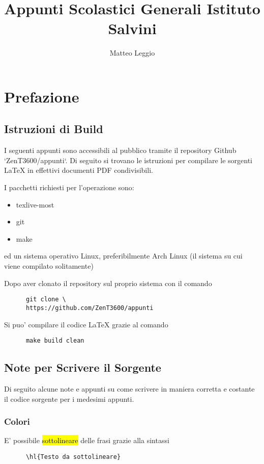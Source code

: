 \documentclass{article}
\begin{document}
  \title{\Huge Appunti Scolastici  Generali Istituto Salvini}
  \author{\Large Matteo Leggio}
  \date{}
  \maketitle

  \section{Prefazione}
  {
    \subsection{Istruzioni di Build}
    I seguenti appunti sono accessibili al pubblico tramite il repository Github `ZenT3600/appunti`. Di seguito si trovano le istruzioni per compilare le sorgenti LaTeX in effettivi documenti PDF condivisibili.

    I pacchetti richiesti per l'operazione sono:
    \begin{itemize}
      \item texlive-most
      \item git
      \item make
    \end{itemize}
    ed un sistema operativo Linux, preferibilmente Arch Linux (il sistema su cui viene compilato solitamente)

    Dopo aver clonato il repository sul proprio sistema con il comando
    \begin{verbatim}
      git clone \
      https://github.com/ZenT3600/appunti
    \end{verbatim}

    Si puo' compilare il codice LaTeX grazie al comando
    \begin{verbatim}
      make build clean
    \end{verbatim}

    \subsection{Note per Scrivere il Sorgente}
    Di seguito alcune note e appunti su come scrivere in maniera corretta e costante il codice sorgente per i medesimi appunti.

    \subsubsection{Colori} %
    E' possibile \hl{sottolineare} delle frasi grazie alla sintassi
    \begin{verbatim}
      \hl{Testo da sottolineare}
    \end{verbatim}

}
\end{document}
